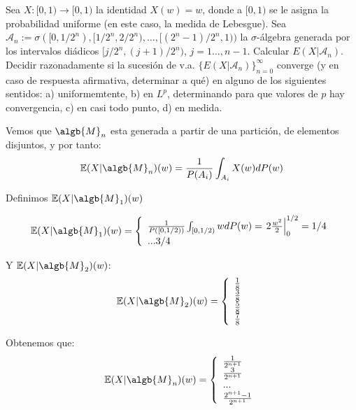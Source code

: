 \begin{problem}[1] Sea $X: [0,1) \to [0,1)$ la identidad $X(w) = w$, donde a $[0,1)$ se le asigna la
probabilidad uniforme (en este caso, la medida de Lebesgue). Sea  $\mathcal{A}_n := \sigma([0,1/2^n), [1/2^n,2/2^n) , \dots,
[ (2^n - 1)/2^n, 1))$ la $ \sigma$-\'algebra generada por los intervalos di\'adicos $ [j/2^n,(j + 1)/2^n)$, $j = 1\dots, n-1$.
Calcular $E(X|\mathcal{A}_n)$. Decidir razonadamente si la sucesi\'on de v.a. $ \{E(X|\mathcal{A}_n)\}_{n=0}^{\infty}$
converge (y en caso de respuesta afirmativa, determinar a qu\'e) en alguno de los siguientes sentidos:
a) uniformemtente, b) en $L^p$, determinando para que valores de $p$ hay convergencia, c) en casi todo punto,
d) en medida.
\solution

\begin{expla}
Vemos que $\algb{M}_n$ esta generada a partir de una partición, de elementos disjuntos, y por tanto:
\[
\mathbb{E}(X|\algb{M}_n)(w)=\frac{1}{P(A_i)} \int_{A_i}X(w)dP(w)
\]

Definimos $\mathbb{E}(X|\algb{M}_1)(w)$

$$
\mathbb{E}(X|\algb{M}_1)(w) =
  \left\lbrace
  \begin{array}{l}
      \frac{1}{P([0, 1/2))}\int_{[0,1/2)}wdP(w)= \left.2 \frac{w^2}{2}\right|_0^{1/2} = 1/4  \\
     ... 3/4  \\
  \end{array}
  \right.
$$

Y $\mathbb{E}(X|\algb{M}_2)(w)$:
$$
\mathbb{E}(X|\algb{M}_2)(w) =
  \left\lbrace
  \begin{array}{l}
      \frac{1}{8}\\
      \frac{3}{8}\\
      \frac{5}{8}\\
      \frac{7}{8}\\
  \end{array}
  \right.
$$

\end{expla}

Obtenemos que:
$$
\mathbb{E}(X|\algb{M}_n)(w) =
  \left\lbrace
  \begin{array}{l}
      \frac{1}{2^{n+1}}\\
      \frac{3}{2^{n+1}}\\
      ...\\
      \frac{2^{n+1}-1}{2^{n+1}}\\
  \end{array}
  \right.
$$


\end{problem}
